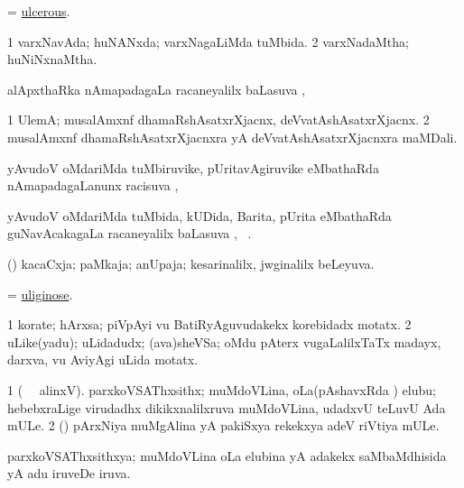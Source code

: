 \bentry
{} 
\gl{\gu}
\expl{}
\bmng
= \hyperlink{ulcerous}{ulcerous}. 
\emng
\eentry

\bentry
{} 
\gl{\gu}
\expl{}
\bmng
\bnum
\num{1} varxNavAda; huNANxda; varxNagaLiMda tuMbida. 
\num{2} varxNadaMtha; huNiNxnaMtha. 
\enum
\emng
\eentry

\bentry
{}
\gl{\uparx}
\expl{}
\bmng
alApxthaRka nAmapadagaLa racaneyalilx baLasuva \uparx, \udA\  
\emng
\eentry

\bentry
{} 
\gl{\nA}
\expl{}
\bmng
\bnum
\num{1} UlemA; musalAmxnf dhamaRshAsatxrXjacnx, deVvatAshAsatxrXjacnx. 
\num{2} musalAmxnf dhamaRshAsatxrXjacnxra yA deVvatAshAsatxrXjacnxra maMDali. 
\enum
\emng
\eentry

\bentry
{}
\gl{\uparx}
\expl{}
\bmng
yAvudoV oMdariMda tuMbiruvike, pUritavAgiruvike eMbathaRda nAmapadagaLanunx racisuva \uparx, \udA\  
\emng
\eentry

\bentry
{} 
\gl{\uparx}
\expl{}
\bmng
yAvudoV oMdariMda tuMbida, kUDida, Barita, pUrita eMbathaRda guNavAcakagaLa racaneyalilx baLasuva \uparx, \udA\ . 
\emng
\eentry

\bentry
{} 
\gl{\gu}
\expl{}
\bmng
(\savi) kacaCxja; paMkaja; anUpaja; kesarinalilx, jwginalilx beLeyuva. 
\emng
\eentry

\bentry
{} 
\gl{\gu}
\expl{}
\bmng
= \hyperlink{uliginose}{uliginose}. 
\emng
\eentry

\bentry
{} 
\gl{\nA}
\expl{}
\bmng
\bnum
\num{1} korate; hArxsa; piVpAyi \mo vu BatiRyAguvudakekx korebidadx motatx. 
\num{2} uLike(yadu); uLidadudx; (ava)sheVSa; oMdu pAterx \mo vugaLalilxTaTx madayx, darxva, \mo vu AviyAgi uLida motatx. 
\enum
\emng
\eentry

\bentry
{} 
\gl{\nA}
\bmng
\bnum
\num{1} (\bava\  \ucAcx\ alinxV). parxkoVSAThxsithx; muMdoVLina, oLa(pAshavxRda ) elubu; hebebxraLige virudadhx dikikxnalilxruva muMdoVLina, udadxvU teLuvU Ada mULe. 
\num{2} (\pArxvi) pArxNiya muMgAlina yA pakiSxya rekekxya adeV riVtiya mULe. 
\enum
\emng
\eentry

\bentry
{} 
\gl{\gu}
\expl{}
\bmng
parxkoVSAThxsithxya; muMdoVLina oLa elubina yA adakekx saMbaMdhisida yA adu iruveDe iruva. 
\emng
\eentry

